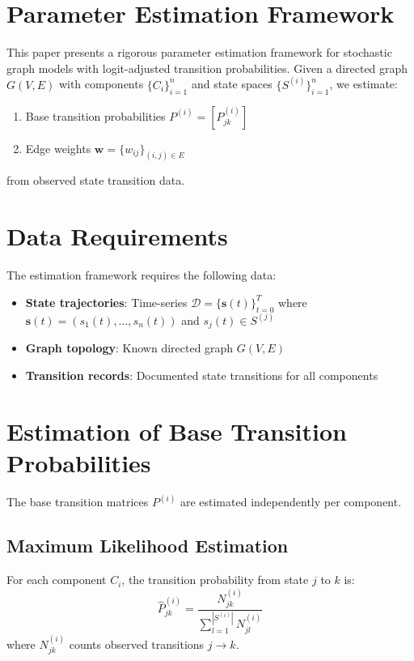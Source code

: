 \documentclass[answers,12pt,addpoints]{exam}
\begin{document}
\section{Parameter Estimation Framework}
This paper presents a rigorous parameter estimation framework for stochastic graph models with logit-adjusted transition probabilities. Given a directed graph $G(V,E)$ with components $\{C_i\}_{i=1}^n$ and state spaces $\{S^{(i)}\}_{i=1}^n$, we estimate:
\begin{enumerate}[label=(\roman*)]
    \item Base transition probabilities $P^{(i)} = [P^{(i)}_{jk}]$
    \item Edge weights $\mathbf{w} = \{w_{ij}\}_{(i,j)\in E}$
\end{enumerate}
from observed state transition data.

\section{Data Requirements}
The estimation framework requires the following data:
\begin{itemize}
    \item \textbf{State trajectories}: Time-series $\mathcal{D} = \{\mathbf{s}(t)\}_{t=0}^T$ where $\mathbf{s}(t) = (s_1(t), \dots, s_n(t))$ and $s_j(t) \in S^{(j)}$
    \item \textbf{Graph topology}: Known directed graph $G(V,E)$
    \item \textbf{Transition records}: Documented state transitions for all components
\end{itemize}

\section{Estimation of Base Transition Probabilities}
The base transition matrices $P^{(i)}$ are estimated independently per component.

\subsection{Maximum Likelihood Estimation}
For each component $C_i$, the transition probability from state $j$ to $k$ is:
\begin{equation}
\hat{P}^{(i)}_{jk} = \frac{N^{(i)}_{jk}}{\sum_{l=1}^{|S^{(i)}|} N^{(i)}_{jl}}
\end{equation}
where $N^{(i)}_{jk}$ counts observed transitions $j \to k$.
\end{document}

